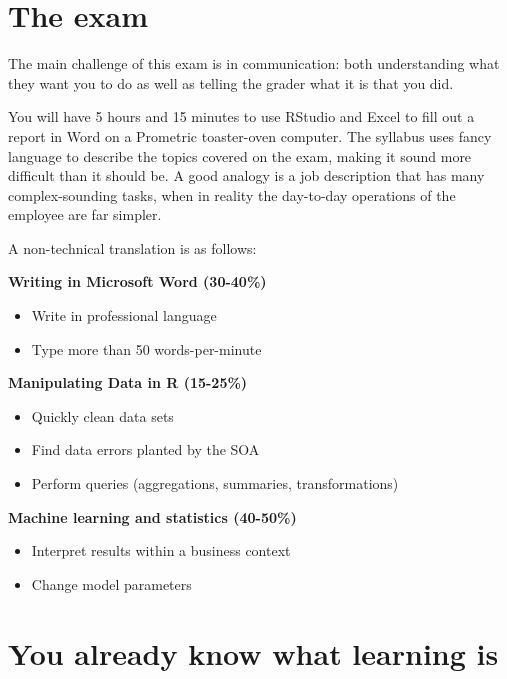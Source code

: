 \documentclass[openany]{book}
\providecommand{\tightlist}{%
  \setlength{\itemsep}{0pt}\setlength{\parskip}{0pt}}
\begin{document}
\hypertarget{the-exam}{%
\chapter{The exam}\label{the-exam}}

The main challenge of this exam is in communication: both understanding what they want you to do as well as telling the grader what it is that you did.

You will have 5 hours and 15 minutes to use RStudio and Excel to fill out a report in Word on a Prometric toaster-oven computer. The syllabus uses fancy language to describe the topics covered on the exam, making it sound more difficult than it should be. A good analogy is a job description that has many complex-sounding tasks, when in reality the day-to-day operations of the employee are far simpler.

A non-technical translation is as follows:

\textbf{Writing in Microsoft Word (30-40\%)}

\begin{itemize}
\tightlist
\item
  Write in professional language
\item
  Type more than 50 words-per-minute
\end{itemize}

\textbf{Manipulating Data in R (15-25\%)}

\begin{itemize}
\tightlist
\item
  Quickly clean data sets
\item
  Find data errors planted by the SOA
\item
  Perform queries (aggregations, summaries, transformations)
\end{itemize}

\textbf{Machine learning and statistics (40-50\%)}

\begin{itemize}
\tightlist
\item
  Interpret results within a business context
\item
  Change model parameters
\end{itemize}

\hypertarget{you-already-know-what-learning-is}{%
\chapter{You already know what learning is}\label{you-already-know-what-learning-is}}
\end{document}

